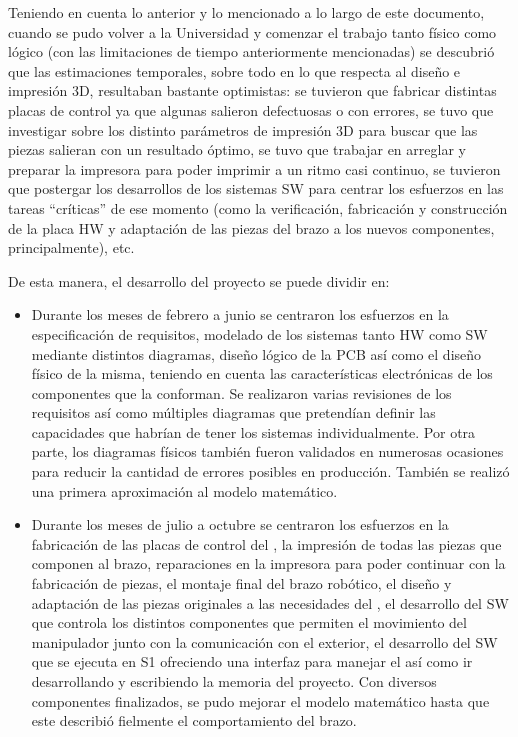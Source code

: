 Teniendo en cuenta lo anterior y lo mencionado a lo largo de este documento, cuando
se pudo volver a la Universidad y comenzar el trabajo tanto físico como lógico
(con las limitaciones de tiempo anteriormente mencionadas) se descubrió que las
estimaciones temporales, sobre todo en lo que respecta al diseño e impresión 3D,
resultaban bastante optimistas: se tuvieron que fabricar distintas placas de
control ya que algunas salieron defectuosas o con errores, se tuvo que investigar sobre los
distinto parámetros de impresión 3D para buscar que las piezas salieran con un 
resultado óptimo, se tuvo que trabajar en arreglar y preparar la impresora para
poder imprimir a un ritmo casi continuo, se tuvieron que postergar los desarrollos
de los sistemas \ac{SW} para centrar los esfuerzos en las tareas ``críticas'' de
ese momento (como la verificación, fabricación y construcción de la placa \ac{HW} y 
adaptación de las piezas del brazo a los nuevos componentes, principalmente), etc.

De esta manera, el desarrollo del proyecto se puede dividir en:
\begin{itemize}
    \item Durante los meses de febrero a junio se centraron los esfuerzos en la
    especificación de requisitos, modelado de los sistemas tanto \ac{HW} como
    \ac{SW} mediante distintos diagramas, diseño lógico de la \ac{PCB} así como
    el diseño físico de la misma, teniendo en cuenta las características electrónicas
    de los componentes que la conforman. Se realizaron varias revisiones de los
    requisitos así como múltiples diagramas que pretendían definir
    las capacidades que habrían de tener los sistemas individualmente. Por otra
    parte, los diagramas físicos también fueron validados en numerosas ocasiones
    para reducir la cantidad de errores posibles en producción. También se realizó
    una primera aproximación al modelo matemático.

    \item Durante los meses de julio a octubre se centraron los esfuerzos en
    la fabricación de las placas de control del \pArm{}, la impresión de todas
    las piezas que componen al brazo, reparaciones en la impresora para poder
    continuar con la fabricación de piezas, el montaje final del brazo robótico,
    el diseño y adaptación de las piezas originales a las necesidades del \pArm{},
    el desarrollo del \ac{SW} que controla los distintos componentes que permiten
    el movimiento del manipulador junto con la comunicación con el exterior, 
    el desarrollo del \ac{SW} que se ejecuta en \ac{S1} ofreciendo una interfaz 
    para manejar el \pArm{} así como ir desarrollando y escribiendo la memoria 
    del proyecto. Con diversos componentes finalizados, se pudo mejorar el
    modelo matemático hasta que este describió fielmente el comportamiento del brazo.
\end{itemize}

